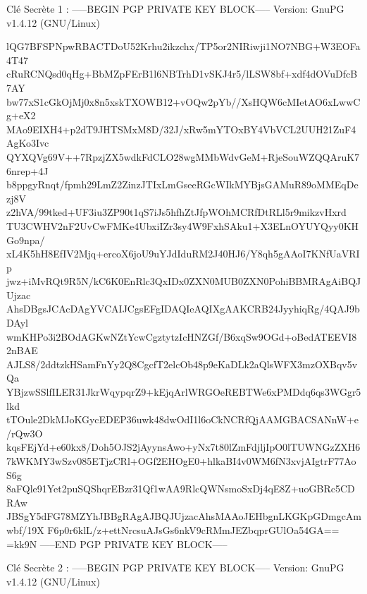 \documentclass{../res/univ-projet}
\begin{document}
Clé Secrète 1 :
-----BEGIN PGP PRIVATE KEY BLOCK-----
Version: GnuPG v1.4.12 (GNU/Linux)

lQG7BFSPNpwRBACTDoU52Krhu2ikzchx/TP5or2NIRiwji1NO7NBG+W3EOFa4T47
cRuRCNQsd0qHg+BbMZpFErB1l6NBTrhD1vSKJ4r5/lLSW8bf+xdf4dOVuDfcB7AY
bw77xS1cGkOjMj0x8n5xskTXOWB12+vOQw2pYb//XsHQW6cMIetAO6xLwwCg+eX2
MAo9EIXH4+p2dT9JHTSMxM8D/32J/xRw5mYTOxBY4VbVCL2UUH21ZuF4AgKo3Ivc
QYXQVg69V++7RpzjZX5wdkFdCLO28wgMMbWdvGeM+RjeSouWZQQAruK76nrep+4J
b8ppgyRnqt/fpmh29LmZ2ZinzJTIxLmGseeRGcWIkMYBjsGAMuR89oMMEqDezj8V
z2hVA/99tked+UF3iu3ZP90t1qS7iJs5hfhZtJfpWOhMCRfDtRLl5r9mikzvHxrd
TU3CWHV2nF2UvCwFMKe4UbxiIZr3sy4W9FxhSAku1+X3ELnOYUYQyy0KHGo9npa/
xL4K5hH8EfIV2Mjq+ercoX6joU9uYJdIduRM2J40HJ6/Y8qh5gAAoI7KNfUaVRIp
jwz+iMvRQt9R5N/kC6K0EnRlc3QxIDx0ZXN0MUB0ZXN0PohiBBMRAgAiBQJUjzac
AhsDBgsJCAcDAgYVCAIJCgsEFgIDAQIeAQIXgAAKCRB24JyyhiqRg/4QAJ9bDAyl
wmKHPo3i2BOdAGKwNZtYcwCgztytzIcHNZGf/B6xqSw9OGd+oBedATEEVI82nBAE
AJLS8/2ddtzkHSamFnYy2Q8CgcfT2elcOb48p9eKaDLk2aQlsWFX3mzOXBqv5vQa
YBjzwSSlfILER31JkrWqypqrZ9+kEjqArlWRGOeREBTWe6xPMDdq6qs3WGgr5lkd
tTOule2DkMJoKGycEDEP36uwk48dwOdI1l6oCkNCRfQjAAMGBACSANnW+e/rQw3O
kqsFEjYd+e60kx8/Doh5OJS2jAyynsAwo+yNx7t80lZmFdjljIpO0lTUWNGzZXH6
7kWKMY3wSzv085ETjzCRl+OGf2EHOgE0+hlkaBI4v0WM6fN3xvjAIgtrF77AoS6g
8aFQle91Yet2puSQShqrEBzr31Qf1wAA9RlcQWNsmoSxDj4qE8Z+uoGBRc5CDRAw
JBSgY5dFG78MZYhJBBgRAgAJBQJUjzacAhsMAAoJEHbgnLKGKpGDmgcAmwbf/19X
F6p0r6klL/z+ettNrcsuAJsGs6nkV9cRMmJEZbqprGUlOa54GA==
=kk9N
-----END PGP PRIVATE KEY BLOCK-----



Clé Secrète 2 :
-----BEGIN PGP PRIVATE KEY BLOCK-----
Version: GnuPG v1.4.12 (GNU/Linux)
\end{document}
